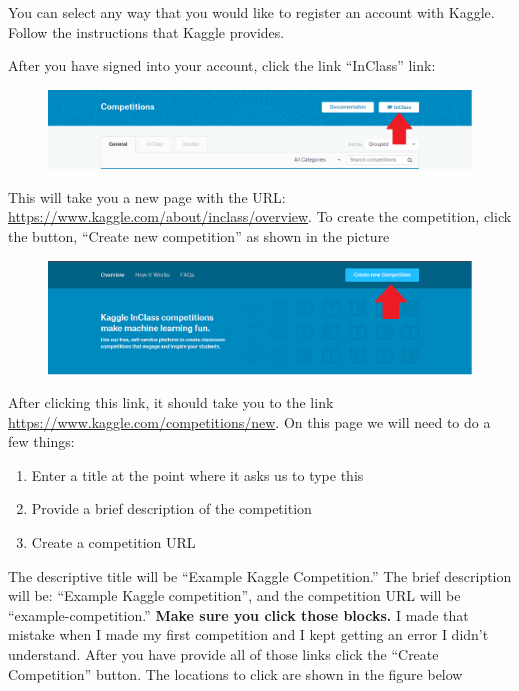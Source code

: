 \documentclass{article}
\begin{document}
You can select any way that you would like to register an account with
Kaggle. Follow the instructions that Kaggle provides.

After you have signed into your account, click the link ``InClass''
link: 

\begin{figure}[H]
    \centering
    \includegraphics[width=\linewidth]{figures/in-class-link.PNG}
\end{figure}

This will take you a new page with the URL:
\url{https://www.kaggle.com/about/inclass/overview}. To create the
competition, click the button, ``Create new competition'' as shown in
the picture

\begin{figure}[H]
    \centering
    \includegraphics[width=\linewidth]{figures/create-competition-page.PNG}
\end{figure}

After clicking this link, it should take you to the link
\url{https://www.kaggle.com/competitions/new}. On this page we will need
to do a few things:

\begin{enumerate}
    \item Enter a title at the point where it asks us to type this
    \item Provide a brief description of the competition
    \item Create a competition URL
\end{enumerate}

The descriptive title will be ``Example Kaggle Competition.'' The brief
description will be: ``Example Kaggle competition'', and the competition
URL will be ``example-competition.'' \textbf{Make sure you click those
blocks.} I made that mistake when I made my first competition and I kept
getting an error I didn't understand. After you have provide all of
those links click the ``Create Competition'' button. The locations to
click are shown in the figure below
\end{document}
